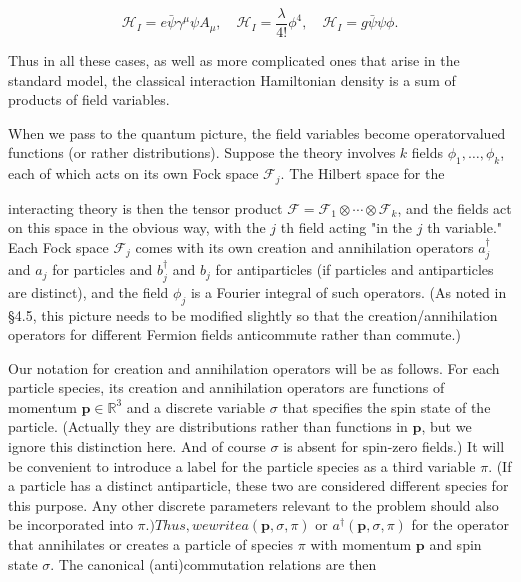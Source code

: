 \documentclass[10pt, letterpaper]{article}
\begin{document}
$$
\mathcal{H}_{I}=e \bar{\psi} \gamma^{\mu} \psi A_{\mu}, \quad \mathcal{H}_{I}=\frac{\lambda}{4!} \phi^{4}, \quad \mathcal{H}_{I}=g \bar{\psi} \psi \phi .
$$

Thus in all these cases, as well as more complicated ones that arise in the standard model, the classical interaction Hamiltonian density is a sum of products of field variables.

When we pass to the quantum picture, the field variables become operatorvalued functions (or rather distributions). Suppose the theory involves $k$ fields $\phi_{1}, \ldots, \phi_{k}$, each of which acts on its own Fock space $\mathcal{F}_{j}$. The Hilbert space for the

interacting theory is then the tensor product $\mathcal{F}=\mathcal{F}_{1} \otimes \cdots \otimes \mathcal{F}_{k}$, and the fields act on this space in the obvious way, with the $j$ th field acting "in the $j$ th variable." Each Fock space $\mathcal{F}_{j}$ comes with its own creation and annihilation operators $a_{j}^{\dagger}$ and $a_{j}$ for particles and $b_{j}^{\dagger}$ and $b_{j}$ for antiparticles (if particles and antiparticles are distinct), and the field $\phi_{j}$ is a Fourier integral of such operators. (As noted in §4.5, this picture needs to be modified slightly so that the creation/annihilation operators for different Fermion fields anticommute rather than commute.)

Our notation for creation and annihilation operators will be as follows. For each particle species, its creation and annihilation operators are functions of momentum $\mathbf{p} \in \mathbb{R}^{3}$ and a discrete variable $\sigma$ that specifies the spin state of the particle. (Actually they are distributions rather than functions in $\mathbf{p}$, but we ignore this distinction here. And of course $\sigma$ is absent for spin-zero fields.) It will be convenient to introduce a label for the particle species as a third variable $\pi$. (If a particle has a distinct antiparticle, these two are considered different species for this purpose. Any other discrete parameters relevant to the problem should also be incorporated into $\pi$.$) Thus, we write a(\mathbf{p}, \sigma, \pi)$ or $a^{\dagger}(\mathbf{p}, \sigma, \pi)$ for the operator that annihilates or creates a particle of species $\pi$ with momentum $\mathbf{p}$ and spin state $\sigma$. The canonical (anti)commutation relations are then
\end{document}
